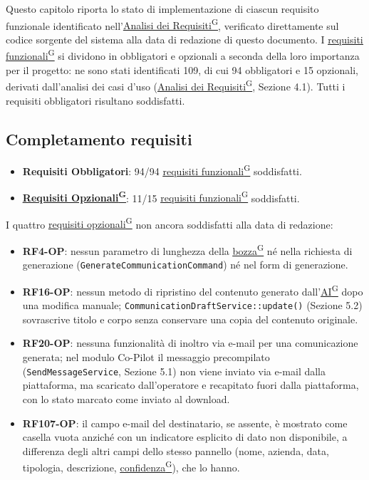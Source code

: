\documentclass[a4paper,12pt]{article}
\providecommand{\glslink}[2]{\href{https://alittlebyte-19.github.io/Documentazione/glossario.html\#gls-#1}{\underline{#2}\textsuperscript{\scriptsize G}}}
\begin{document}
\begin{sloppypar}

Questo capitolo riporta lo stato di implementazione di ciascun requisito funzionale identificato nell'\glslink{analisi-dei-requisiti-adr}{Analisi dei Requisiti}, verificato direttamente sul codice sorgente del sistema alla data di redazione di questo documento. I \glslink{requisiti-funzionali}{requisiti funzionali} si dividono in obbligatori e opzionali a seconda della loro importanza per il progetto: ne sono stati identificati 109, di cui 94 obbligatori e 15 opzionali, derivati dall'analisi dei casi d'uso (\glslink{analisi-dei-requisiti-adr}{Analisi dei Requisiti}, Sezione 4.1). Tutti i requisiti obbligatori risultano soddisfatti.

\subsection{Completamento requisiti}

\begin{itemize}
    \item \textbf{Requisiti Obbligatori}: 94/94 \glslink{requisiti-funzionali}{requisiti funzionali} soddisfatti.
    \item \textbf{\glslink{requisiti-opzionali}{Requisiti Opzionali}}: 11/15 \glslink{requisiti-funzionali}{requisiti funzionali} soddisfatti.
\end{itemize}

I quattro \glslink{requisiti-opzionali}{requisiti opzionali} non ancora soddisfatti alla data di redazione:
\begin{itemize}
    \item \textbf{RF4-OP}: nessun parametro di lunghezza della \glslink{bozza-draft}{bozza} né nella richiesta di generazione (\texttt{GenerateCommunicationCommand}) né nel form di generazione.
    \item \textbf{RF16-OP}: nessun metodo di ripristino del contenuto generato dall'\glslink{intelligenza-artificiale-ai}{AI} dopo una modifica manuale; \texttt{CommunicationDraftService::update()} (Sezione 5.2) sovrascrive titolo e corpo senza conservare una copia del contenuto originale.
    \item \textbf{RF20-OP}: nessuna funzionalità di inoltro via e-mail per una comunicazione generata; nel modulo Co-Pilot il messaggio precompilato (\texttt{SendMessageService}, Sezione 5.1) non viene inviato via e-mail dalla piattaforma, ma scaricato dall'operatore e recapitato fuori dalla piattaforma, con lo stato marcato come inviato al download.
    \item \textbf{RF107-OP}: il campo e-mail del destinatario, se assente, è mostrato come casella vuota anziché con un indicatore esplicito di dato non disponibile, a differenza degli altri campi dello stesso pannello (nome, azienda, data, tipologia, descrizione, \glslink{confidenza-confidence-score}{confidenza}), che lo hanno.
\end{itemize}


\end{sloppypar}
\end{document}
